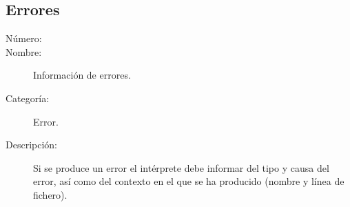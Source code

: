 \subsection{Errores}
	\begin{description}
		\item [Número:] \cn
		\item [Nombre:] Información de errores.
		\item [Categoría:] Error.
		\item [Descripción:] Si se produce un error el intérprete debe informar del tipo y causa del error, así como del contexto en el que se ha producido (nombre y línea de fichero).
	\end {description}

